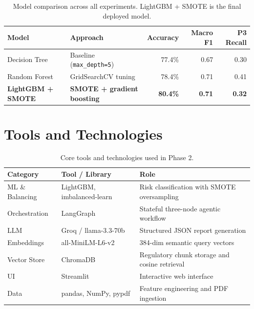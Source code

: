 \documentclass[11pt,a4paper]{article}
\begin{document}
\begin{table}[h!]
    \centering
    \small
    \begin{tabular}{@{} l l r r r @{}}
        \toprule
        \textbf{Model} & \textbf{Approach} & \textbf{Accuracy} & \textbf{Macro F1} & \textbf{P3 Recall} \\
        \midrule
        Decision Tree             & Baseline (\texttt{max\_depth=5})   & 77.4\% & 0.67 & 0.30 \\
        Random Forest             & GridSearchCV tuning                & 78.4\% & 0.71 & 0.41 \\
        \textbf{LightGBM + SMOTE} & \textbf{SMOTE + gradient boosting} & \textbf{80.4\%} & \textbf{0.71} & \textbf{0.32} \\
        \bottomrule
    \end{tabular}
    \caption{Model comparison across all experiments. LightGBM + SMOTE is the final deployed model.}
    \label{tab:model_comparison}
\end{table}

\section{Tools and Technologies}

\begin{table}[h!]
    \centering
    \small
    \renewcommand{\arraystretch}{1.4}
    \begin{tabular}{@{} l l p{7.5cm} @{}}
        \toprule
        \textbf{Category} & \textbf{Tool / Library} & \textbf{Role} \\
        \midrule
        ML \& Balancing    & LightGBM, imbalanced-learn  & Risk classification with SMOTE oversampling \\
        Orchestration      & LangGraph                   & Stateful three-node agentic workflow \\
        LLM                & Groq / llama-3.3-70b        & Structured JSON report generation \\
        Embeddings         & all-MiniLM-L6-v2            & 384-dim semantic query vectors \\
        Vector Store       & ChromaDB                    & Regulatory chunk storage and cosine retrieval \\
        UI                 & Streamlit                   & Interactive web interface \\
        Data               & pandas, NumPy, pypdf        & Feature engineering and PDF ingestion \\
        \bottomrule
    \end{tabular}
    \caption{Core tools and technologies used in Phase 2.}
    \label{tab:tools}
\end{table}
\end{document}
